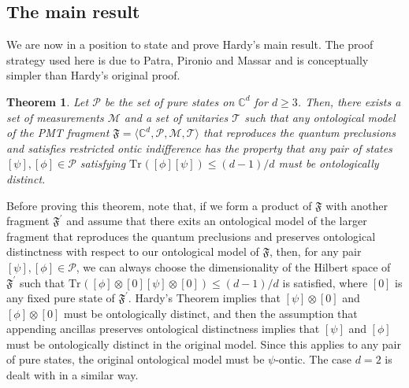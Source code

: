 \documentclass[DIV=calc,fontsize=12pt]{scrartcl} %
\theoremstyle{definition}
\theoremstyle{plain}
\newtheorem{theorem}[definition]{Theorem}
\newcommand{\Proj}[1]{\ensuremath{\left [ #1 \right ]}}
\newcommand{\Tr}[2][]{\ensuremath{\text{Tr}_{#1} \left ( #2 \right )}}
\begin{document}
\subsection{The main result}

\label{HMain}

We are now in a position to state and prove Hardy's main result.  The
proof strategy used here is due to Patra, Pironio and Massar
\cite{Patra2013a} and is conceptually simpler than Hardy's original
proof.

\begin{theorem}
\label{thm:Hardy:hardy}
Let $\mathcal{P}$ be the set of pure states on $\mathbb{C}^d$ for $d
\geq 3$.  Then, there exists a set of measurements $\mathcal{M}$ and
a set of unitaries $\mathcal{T}$ such that any ontological model of
the PMT fragment $\mathfrak{F} = \langle \mathbb{C}^d, \mathcal{P},
\mathcal{M}, \mathcal{T} \rangle$ that reproduces the quantum
preclusions and satisfies restricted ontic indifference has the
property that any pair of states $\Proj{\psi}, \Proj{\phi} \in
\mathcal{P}$ satisfying $\Tr{\Proj{\phi}\Proj{\psi}} \leq (d-1)/d$
must be ontologically distinct.
\end{theorem}

Before proving this theorem, note that, if we form a product of
$\mathfrak{F}$ with another fragment $\mathfrak{F}^{\prime}$ and
assume that there exits an ontological model of the larger fragment
that reproduces the quantum preclusions and preserves ontological
distinctness with respect to our ontological model of $\mathfrak{F}$,
then, for any pair $\Proj{\psi}, \Proj{\phi} \in \mathcal{P}$, we can
always choose the dimensionality of the Hilbert space of
$\mathfrak{F}^{\prime}$ such that $\Tr{\Proj{\phi} \otimes \Proj{0}
  \Proj{\psi} \otimes \Proj{0}} \leq (d-1)/d$ is satisfied, where
$\Proj{0}$ is any fixed pure state of $\mathfrak{F}^{\prime}$.
Hardy's Theorem implies that $\Proj{\psi} \otimes \Proj{0}$ and
$\Proj{\phi} \otimes \Proj{0}$ must be ontologically distinct, and
then the assumption that appending ancillas preserves ontological
distinctness implies that $\Proj{\psi}$ and $\Proj{\phi}$ must be
ontologically distinct in the original model.  Since this applies to
any pair of pure states, the original ontological model must be
$\psi$-ontic.  The case $d=2$ is dealt with in a similar way.
\end{document}
